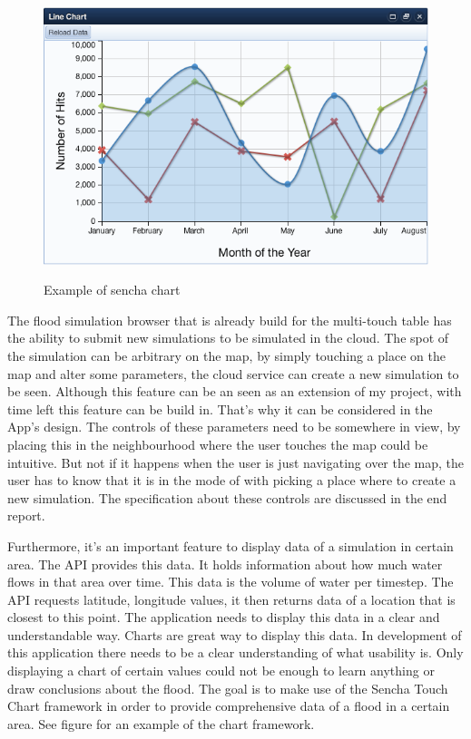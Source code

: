 \begin{figure}[ht]
	\includegraphics[scale=0.5]{chart.png} \\
\caption{Example of sencha chart}
\label{fig:sencha chart}
\end{figure}

The flood simulation browser that is already build for the multi-touch table has the ability to submit new simulations to be simulated in the cloud. The spot of the simulation can be arbitrary on the map, by simply touching a place on the map and alter some parameters, the cloud service can create a new simulation to be seen. Although this feature can be an seen as an extension of my project, with time left this feature can be build in. That's why it can be considered in the App's design. The controls of these parameters need to be somewhere in view, by placing this in the neighbourhood where the user touches the map could be intuitive. But not if it happens when the user is just navigating over the map, the user has to know that it is in the mode of with picking a place where to create a new simulation. The specification about these controls are discussed in the end report.

Furthermore, it's an important feature to display data of a simulation in certain area. The API provides this data. It holds information about how much water flows in that area over time. This data is the volume of water per timestep. The API requests latitude, longitude values, it then returns data of a location that is closest to this point. The application needs to display this data in a clear and understandable way. Charts are great way to display this data. In development of this application there needs to be a clear understanding of what usability is. Only displaying a chart of certain values could not be enough to learn anything or draw conclusions about the flood. The goal is to make use of the Sencha Touch Chart framework in order to provide comprehensive data of a flood in a certain area. See figure \label{fig:sencha chart} for an example of the chart framework.

